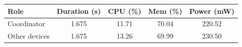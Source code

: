 \begin{tabular}{lcccc}
\hline
\textbf{Role} & \textbf{Duration (s)} & \textbf{CPU (\%)} & \textbf{Mem (\%)} & \textbf{Power (mW)} \\
\hline
Coordinator & 1.675 & 11.71 & 70.04 & 220.52 \\
Other devices & 1.675 & 13.26 & 69.99 & 230.50 \\
\hline
\end{tabular}
